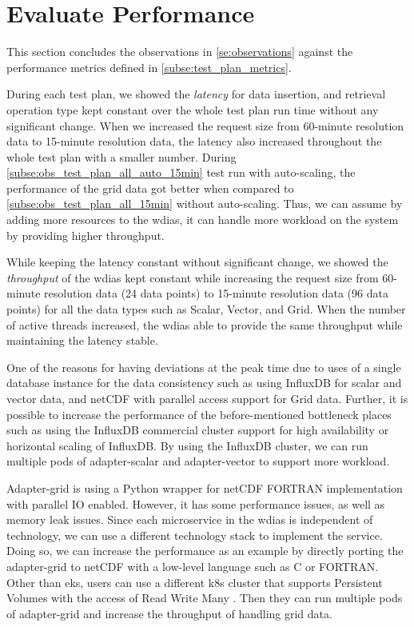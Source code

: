 \section{Evaluate Performance}
\label{se:discussion}

This section concludes the observations in \cref{se:observations} against the performance metrics defined in \cref{subse:test_plan_metrics}.

During each test plan, we showed the \emph{latency} for data insertion, and retrieval operation type kept constant over the whole test plan run time without any significant change. When we increased the request size from 60-minute resolution data to 15-minute resolution data, the latency also increased throughout the whole test plan with a smaller number.
During \cref{subse:obs_test_plan_all_auto_15min} test run with auto-scaling, the performance of the grid data got better when compared to \cref{subse:obs_test_plan_all_15min} without auto-scaling. Thus, we can assume by adding more resources to the \acrshort{wdias}, it can handle more workload on the system by providing higher throughput.

While keeping the latency constant without significant change, we showed the \emph{throughput} of the \acrshort{wdias} kept constant while increasing the request size from 60-minute resolution data (24 data points) to 15-minute resolution data (96 data points) for all the data types such as Scalar, Vector, and Grid. When the number of active threads increased, the \acrshort{wdias} able to provide the same throughput while maintaining the latency stable.

One of the reasons for having deviations at the peak time due to uses of a single database instance for the data consistency such as using InfluxDB for scalar and vector data, and netCDF with parallel access support for Grid data. Further, it is possible to increase the performance of the before-mentioned bottleneck places such as using the InfluxDB commercial cluster support for high availability or horizontal scaling of InfluxDB. By using the InfluxDB cluster, we can run multiple pods of adapter-scalar and adapter-vector to support more workload.

Adapter-grid is using a Python wrapper for netCDF FORTRAN implementation with parallel IO enabled. However, it has some performance issues, as well as memory leak issues. Since each microservice in the \acrshort{wdias} is independent of technology, we can use a different technology stack to implement the service. Doing so, we can increase the performance as an example by directly porting the adapter-grid to netCDF with a low-level language such as C or FORTRAN. Other than \acrshort{eks}, users can use a different \acrshort{k8s} cluster that supports Persistent Volumes with the access of Read Write Many \cite{LinuxFoundationPersistentKubernetes}. Then they can run multiple pods of adapter-grid and increase the throughput of handling grid data.

